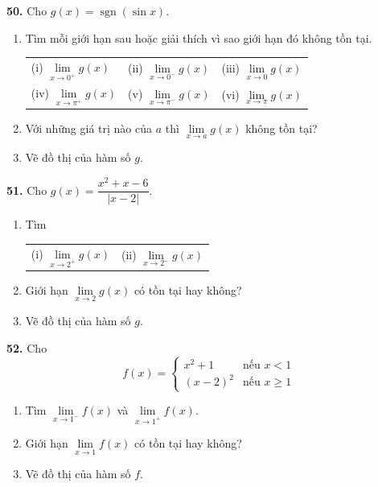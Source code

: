 \noindent
\begin{minipage}[t]{0.485\textwidth}
\setlength{\parindent}{0pt}

\textbf{50.} Cho $g(x) = \operatorname{sgn}(\sin x)$.
\begin{enumerate}[label=\textnormal{(\alph*)}, nosep, leftmargin=1.5em]
    \item Tìm mỗi giới hạn sau hoặc giải thích vì sao giới hạn đó không tồn tại.
    \vspace{1pt}
    
    \begin{tabularx}{\linewidth}{@{}XXX@{}}
    (i) $\lim\limits_{x \to 0^+} g(x)$ & (ii) $\lim\limits_{x \to 0^-} g(x)$ & (iii) $\lim\limits_{x \to 0} g(x)$ \\[4pt]
    (iv) $\lim\limits_{x \to \pi^+} g(x)$ & (v) $\lim\limits_{x \to \pi^-} g(x)$ & (vi) $\lim\limits_{x \to \pi} g(x)$
    \end{tabularx}
    \vspace{1pt}
    \item Với những giá trị nào của $a$ thì $\lim\limits_{x \to a} g(x)$ không tồn tại?
    \item Vẽ đồ thị của hàm số $g$.
\end{enumerate}

\vspace{6pt}
\textbf{51.} Cho $g(x) = \dfrac{x^2 + x - 6}{|x - 2|}$.
\begin{enumerate}[label=\textnormal{(\alph*)}, nosep, leftmargin=1.5em]
    \item Tìm
    \vspace{1pt}
    
    \begin{tabularx}{\linewidth}{@{}XX@{}}
    (i) $\lim\limits_{x \to 2^+} g(x)$ & (ii) $\lim\limits_{x \to 2^-} g(x)$
    \end{tabularx}
    \vspace{1pt}
    \item Giới hạn $\lim\limits_{x \to 2} g(x)$ có tồn tại hay không?
    \item Vẽ đồ thị của hàm số $g$.
\end{enumerate}

\vspace{6pt}
\textbf{52.} Cho
\[
f(x) = \begin{cases}
x^2 + 1 & \text{nếu } x < 1 \\
(x - 2)^2 & \text{nếu } x \ge 1
\end{cases}
\]
\begin{enumerate}[label=\textnormal{(\alph*)}, nosep, leftmargin=1.5em]
    \item Tìm $\lim\limits_{x \to 1^-} f(x)$ và $\lim\limits_{x \to 1^+} f(x)$.
    \item Giới hạn $\lim\limits_{x \to 1} f(x)$ có tồn tại hay không?
    \item Vẽ đồ thị của hàm số $f$.
\end{enumerate}


\end{minipage}
